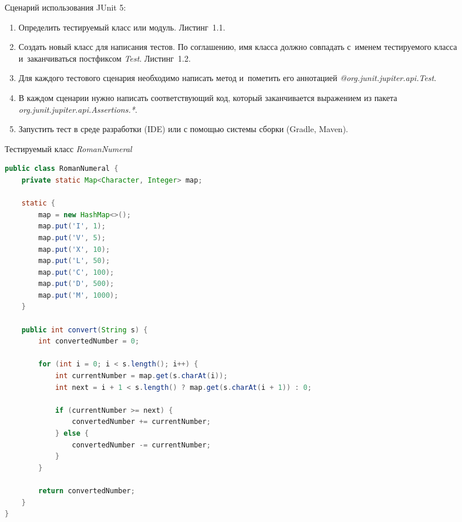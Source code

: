 Сценарий использования JUnit 5: 

\begin{enumerate}
	\item Определить тестируемый класс или модуль. Листинг~1.1.
	\item Создать новый класс для написания тестов. По соглашению, имя класса должно совпадать с~именем тестируемого класса и~заканчиваться постфиксом \textit{Test}. Листинг~1.2.
	\item Для каждого тестового сценария необходимо написать метод и~пометить его аннотацией \textit{@org.junit.jupiter.api.Test}.
	\item В каждом сценарии нужно написать соответствующий код, который заканчивается выражением из пакета \textit{org.junit.jupiter.api.Assertions.*}. 
	\item Запустить тест в среде разработки (IDE) или с помощью системы сборки (Gradle, Maven).
\end{enumerate}

\begin{ListingEnv}[!h]%
	\captiondelim{ } %
	\caption{Тестируемый класс \textit{RomanNumeral}}
	\begin{lstlisting}[language={Java}]
public class RomanNumeral {
	private static Map<Character, Integer> map;
	
	static {
		map = new HashMap<>();
		map.put('I', 1);
		map.put('V', 5);
		map.put('X', 10);
		map.put('L', 50);
		map.put('C', 100);
		map.put('D', 500);
		map.put('M', 1000);
	}
	
	public int convert(String s) {
		int convertedNumber = 0;
		
		for (int i = 0; i < s.length(); i++) {
			int currentNumber = map.get(s.charAt(i));
			int next = i + 1 < s.length() ? map.get(s.charAt(i + 1)) : 0;
			
			if (currentNumber >= next) {
				convertedNumber += currentNumber;
			} else {
				convertedNumber -= currentNumber;
			}
		}
		
		return convertedNumber;
	}
}
	\end{lstlisting}
\end{ListingEnv}%

